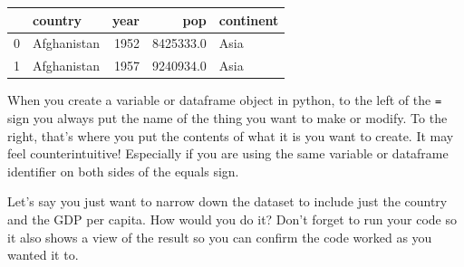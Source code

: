 \documentclass[
  letterpaper,
  DIV=11,
  numbers=noendperiod]{scrreprt}
\begin{document}
\begin{tabular}{llrrl}
\toprule
{} &      country &  year &        pop & continent \\
\midrule
0 &  Afghanistan &  1952 &  8425333.0 &      Asia \\
1 &  Afghanistan &  1957 &  9240934.0 &      Asia \\
\bottomrule
\end{tabular}

\begin{tcolorbox}[enhanced jigsaw, colframe=quarto-callout-tip-color-frame, toprule=.15mm, colback=white, leftrule=.75mm, rightrule=.15mm, breakable, colbacktitle=quarto-callout-tip-color!10!white, arc=.35mm, bottomtitle=1mm, bottomrule=.15mm, titlerule=0mm, title=\textcolor{quarto-callout-tip-color}{\faLightbulb}\hspace{0.5em}{Reminder on Assignment!}, toptitle=1mm, left=2mm, opacityback=0, coltitle=black, opacitybacktitle=0.6]
When you create a variable or dataframe object in python, to the left of
the \texttt{=} sign you always put the name of the thing you want to
make or modify. To the right, that's where you put the contents of what
it is you want to create. It may feel counterintuitive! Especially if
you are using the same variable or dataframe identifier on both sides of
the equals sign.
\end{tcolorbox}

\begin{tcolorbox}[enhanced jigsaw, colframe=quarto-callout-warning-color-frame, toprule=.15mm, colback=white, leftrule=.75mm, rightrule=.15mm, breakable, colbacktitle=quarto-callout-warning-color!10!white, arc=.35mm, bottomtitle=1mm, bottomrule=.15mm, titlerule=0mm, title={Challenge 1}, toptitle=1mm, left=2mm, opacityback=0, coltitle=black, opacitybacktitle=0.6]
Let's say you just want to narrow down the dataset to include just the
country and the GDP per capita. How would you do it? Don't forget to run
your code so it also shows a view of the result so you can confirm the
code worked as you wanted it to.
\end{tcolorbox}
\end{document}
